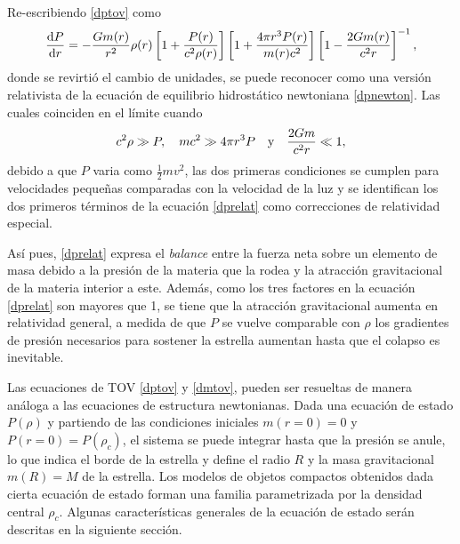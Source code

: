 Re-escribiendo \eqref{dptov} como
\begin{equation}
    \dv{P}{r} =  - \frac { G  m ( r ) } { r ^ { 2 } } \rho ( r ) \left[ 1 + \frac { P ( r ) } {c ^ { 2 } \rho ( r ) } \right] \left[ 1 + \frac { 4 \pi r ^ { 3 } P ( r ) } { m ( r ) c ^ { 2 } } \right]  \left[ 1 - \frac { 2 G m ( r ) } { c ^ { 2 } r } \right] ^ { - 1 }, 
    \label{dprelat}
\end{equation}
donde se revirtió el cambio de unidades, se puede reconocer como una versión relativista de la ecuación de equilibrio hidrostático newtoniana \eqref{dpnewton}. Las cuales coinciden en el límite cuando 
\begin{equation}
    c^2\rho \gg P \qc mc^2 \gg 4\pi r^3P \quad \text{y} \quad  \frac{2Gm}{c^2r}\ll 1,
\end{equation}
debido a que $P$ varia como $\frac{1}{2}mv^2$, las dos primeras condiciones se cumplen para velocidades pequeñas comparadas con la velocidad de la luz y se identifican los dos primeros términos de la ecuación \eqref{dprelat} como correcciones de relatividad especial.

Así pues, \eqref{dprelat} expresa el \textit{balance} entre la fuerza neta sobre un elemento de masa debido a la presión de la materia que la rodea y la atracción gravitacional de la materia interior a este. Además, como los tres factores en la ecuación \eqref{dprelat} son mayores que 1, se tiene que la atracción gravitacional aumenta en relatividad general, a medida de que $P$ se vuelve comparable con $\rho$ los gradientes de presión necesarios para sostener la estrella aumentan hasta que el colapso es inevitable.


Las ecuaciones de TOV \eqref{dptov} y \eqref{dmtov}, pueden ser resueltas de manera análoga a las ecuaciones de estructura newtonianas. Dada una ecuación de estado $P(\rho)$ y partiendo de las condiciones iniciales $m(r=0)=0$ y $P(r=0)=P(\rho_c)$, el sistema se puede integrar hasta que la presión se anule, lo que indica el borde de la estrella y define el radio $R$ y la masa gravitacional $m(R)=M$ de la estrella. Los modelos de objetos compactos obtenidos dada cierta ecuación de estado forman una familia parametrizada por la densidad central $\rho_c$. Algunas características generales de la ecuación de estado serán descritas en la siguiente sección.

